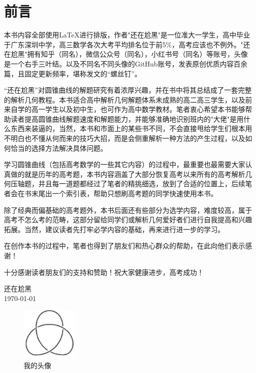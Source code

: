 \documentclass[12pt,a4paper, oneside,UTF8]{ctexbook}
\begin{document}

\frontmatter
\pagestyle{frontmatter} %
\chapter*{前言}
本书内容全部使用\LaTeX{}进行排版，作者"还在尬黑"是一位准大一学生，高中毕业于广东深圳中学，高三数学各次大考平均排名位于前5\%，高考应该也不例外。"还在尬黑"拥有知乎（同名），微信公众号（同名），小红书号（同名）等账号，头像是一个右手三叶结。以及不同名不同头像的GitHub账号，发表原创优质内容百余篇，且固定更新频率，堪称发文的“螺丝钉”。

“还在尬黑”对圆锥曲线的解题研究有着浓厚兴趣，并在书中将其总结成了一套完整的解析几何教程。本书适合高中解析几何解题体系未成熟的高二高三学生，以及前来自学的高一学生以及初中生，也可作为高中数学教材。笔者衷心希望本书能够帮助读者提高圆锥曲线解题速度和解题能力，并能够准确地识别班内的"大佬"是用什么东西来装逼的，当然，本书和市面上的某些书不同，不会直接甩给学生们根本用不明白也不懂从何而来的技巧大招，而是会侧重解析一种方法的产生过程，以及如何恰当的选择方法解决具体问题。

学习圆锥曲线（包括高考数学的一些其它内容）的过程中，最重要也最需要大家认真做的就是历年的高考题，本书内容涵盖了大部分恢复高考以来所有的高考解析几何压轴题，并且每一道题都经过了笔者的精挑细选，放到了合适的位置上，后续笔者会在书末尾出一个索引表，帮助只想刷高考题的同学快速使用本书。

除了经典而偏基础的高考题外，本书后面还有些部分为选学内容，难度较高，属于高考不怎么考的范畴，这部分留给同学们或解析几何爱好者们进行自我提高和兴趣拓展。当然，建议读者先打牢必学内容的基础，再来进行进一步的学习。

在创作本书的过程中，笔者也得到了朋友们和热心群众的帮助，在此向他们表示感谢！

十分感谢读者朋友们的支持和赞助！祝大家健康进步，高考成功！
\begin{flushright}
    \vspace{2\baselineskip} %
    \kt 还在尬黑 \\ %
    \today
\end{flushright}
\begin{figure}[htbp]
	\centering
    \includegraphics[width=0.25\textwidth]{flg/logo.png}%
	\caption{我的头像}
	\label{fig0-1}
\end{figure}

\newpage
{}%
\tableofcontents
\thispagestyle{tocmatter} 
\mainmatter
\pagestyle{mainmatter} %





\end{document}
